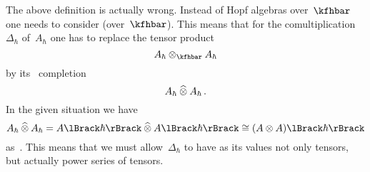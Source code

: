 \documentclass[a4paper, 11pt, oneside]{scrartcl}
\begin{document}
\begin{remark}
      The above definition is actually wrong.
      Instead of Hopf algebras over~$\kfhbar$ one needs to consider  (over~$\kfhbar$).
      This means that for the comultiplication~$\Delta_{\hbar}$ of~$A_\hbar$ one has to replace the tensor product
      \[
        A_\hbar \tensor_{\kfhbar} A_\hbar
      \]
      by its~\adic{$\hbar$} completion
      \[
        A_\hbar \mathbin{\widehat{\otimes}} A_\hbar \,.
      \]
      In the given situation we have
      \[
        A_\hbar \ctensor A_\hbar
        =
        \power{A}{\hbar} \ctensor \power{A}{\hbar}
        \cong
        \power{(A \tensor A)}{\hbar}
      \]
      as~\modules{$\kfhbar$}.
      This means that we must allow~$\Delta_{\hbar}$ to have as its values not only tensors, but actually power series of tensors.
\end{remark}
\end{document}
